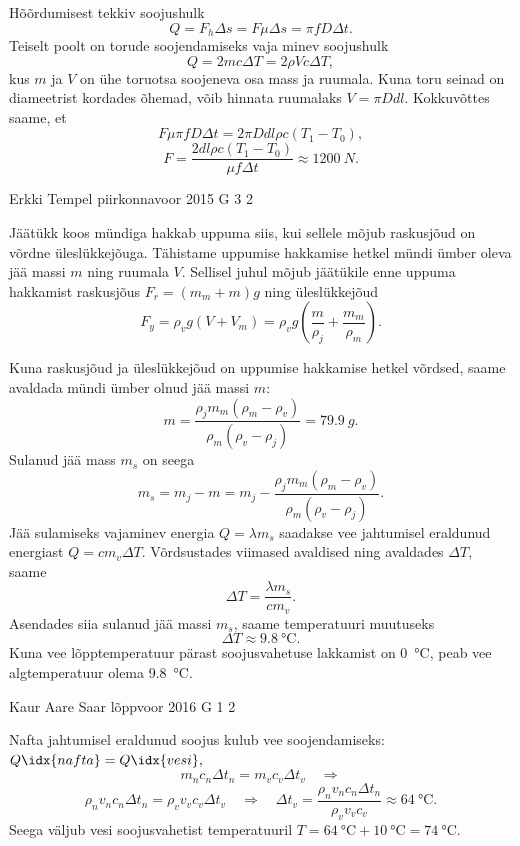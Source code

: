 \documentclass[11pt, twoside]{article}
\begin{document}
{{\ifSolution
Hõõrdumisest tekkiv soojushulk
\[
Q = F_h \Delta s = F \mu \Delta s = \pi f D \Delta t.
\]
Teiselt poolt on torude soojendamiseks vaja minev soojushulk
\[
Q = 2 m c \Delta T = 2 \rho V c \Delta T,
\]
kus $m$ ja $V$ on ühe toruotsa soojeneva osa mass ja ruumala. Kuna toru seinad on diameetrist kordades õhemad, võib hinnata ruumalaks $V = \pi D d l$. Kokkuvõttes saame, et
\[
F \mu \pi f D \Delta t = 2 \pi D d l \rho c ( T_1 - T_0 ),
\]
\[
F = \frac{2 d l \rho c ( T_1 - T_0 )}{ \mu f \Delta t } \approx \SI{1200}{N}.
\]
\fi
}

{Erkki Tempel} %
{piirkonnavoor} %
{2015} %
{G 3} %
{2} %
{

\ifSolution
Jäätükk koos mündiga hakkab uppuma siis, kui sellele mõjub raskusjõud on võrdne üleslükkejõuga. Tähistame uppumise hakkamise hetkel mündi ümber oleva jää massi $m$ ning ruumala $V$. Sellisel juhul mõjub jäätükile enne uppuma hakkamist raskusjõus $F_r=(m_m+m)g$ ning üleslükkejõud
\[ F_y=\rho_v g(V + V_m)=\rho_v g\left(\frac{m}{\rho_j} + \frac{m_m}{\rho_m}\right). \]

Kuna raskusjõud ja üleslükkejõud on uppumise hakkamise hetkel võrdsed, saame avaldada mündi ümber olnud jää massi $m$:
\[ m = \frac{\rho_j m_m(\rho_m - \rho_v)}{\rho_m(\rho_v - \rho_j)} = \SI{79,9}{g}. \]
Sulanud jää mass $m_s$ on seega
\[ m_s = m_j - m = m_j - \frac{\rho_j m_m(\rho_m - \rho_v)}{\rho_m(\rho_v - \rho_j)}. \]
Jää sulamiseks vajaminev energia $Q=\lambda m_s$ saadakse vee jahtumisel eraldunud energiast $Q=cm_v\Delta T$. Võrdsustades viimased avaldised ning avaldades $\Delta T$, saame
\[ \Delta T = \frac{\lambda m_s}{cm_v}. \]
Asendades siia sulanud jää massi $m_s$, saame temperatuuri muutuseks
\[ \Delta T \approx \SI{9,8}{\celsius}. \]
Kuna vee lõpptemperatuur pärast soojusvahetuse lakkamist on \SI{0}{\celsius}, peab vee algtemperatuur olema \SI{9,8}{\celsius}.
\fi
}

{Kaur Aare Saar} %
{lõppvoor} %
{2016} %
{G 1} %
{2} %
{

\ifSolution
Nafta jahtumisel eraldunud soojus kulub vee soojendamiseks: $Q\idx{nafta} = Q\idx{vesi},$
\[ m_nc_n\Delta t_n = m_vc_v\Delta t_v \quad\Rightarrow \]
\[ \rho_nv_nc_n\Delta t_n = \rho_v v_vc_v\Delta t_v \quad\Rightarrow\quad \Delta t_v = \frac{\rho_nv_nc_n\Delta t_n}{\rho_vv_vc_v} \approx \SI{64}{\celsius}. \]
Seega väljub vesi soojusvahetist temperatuuril $T = \SI{64}{\celsius} + \SI{10}{\celsius} = \SI{74}{\celsius}$.
\fi
}

}
\end{document}
